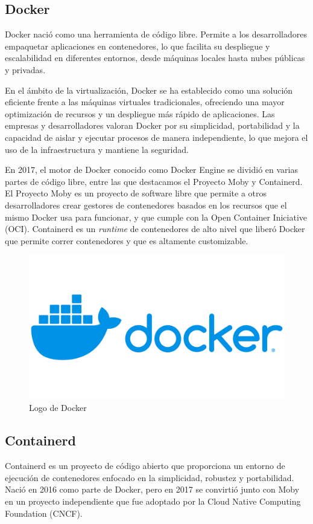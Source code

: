 \subsection{Docker}

Docker nació como una herramienta de código libre. Permite a los desarrolladores empaquetar aplicaciones en contenedores, lo que facilita su despliegue y escalabilidad en diferentes entornos, desde máquinas locales hasta nubes públicas y privadas.

En el ámbito de la virtualización, Docker se ha establecido como una solución 
eficiente frente a las máquinas virtuales tradicionales, ofreciendo una mayor optimización de recursos y un despliegue más rápido de aplicaciones. Las empresas y desarrolladores valoran Docker por su simplicidad, portabilidad y la capacidad de aislar y ejecutar procesos de manera independiente, lo que mejora el uso de la infraestructura y mantiene la seguridad.

En 2017, el motor de Docker conocido como Docker Engine se dividió en varias partes de código libre, entre las que destacamos el Proyecto Moby y Containerd. El Proyecto Moby es un proyecto de software libre que permite a otros desarrolladores crear gestores de contenedores basados en los recursos que el mismo Docker usa para funcionar, y que cumple con la Open Container Iniciative (OCI). Containerd es un \textit{runtime} de contenedores de alto nivel que liberó Docker que permite correr contenedores y que es altamente customizable.


\begin{figure}[h!]
    \centering
    \includegraphics[width=0.5\linewidth]{figures/Docker-Logo.png}
    \caption{Logo de Docker}
    \label{fig:Docker-Logo}
\end{figure}


\subsection{Containerd}

Containerd es un proyecto de código abierto que proporciona un entorno de ejecución de contenedores enfocado en la simplicidad, robustez y portabilidad. Nació en 2016 como parte de Docker, pero en 2017 se convirtió junto con Moby en un proyecto independiente que fue adoptado por la Cloud Native Computing Foundation (CNCF).

